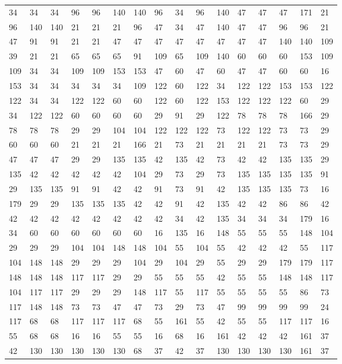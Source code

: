 \begin{longtable}{*{16}{l}}
34& 34& 34& 96& 96& 140& 140& 96& 34& 96& 140& 47& 47& 47& 171& 21\\
96& 140& 140& 21& 21& 21& 96& 47& 34& 47& 140& 47& 47& 96& 96& 21\\
47& 91& 91& 21& 21& 47& 47& 47& 47& 47& 47& 47& 47& 140& 140& 109\\
39& 21& 21& 65& 65& 65& 91& 109& 65& 109& 140& 60& 60& 60& 153& 109\\
109& 34& 34& 109& 109& 153& 153& 47& 60& 47& 60& 47& 47& 60& 60& 16\\
153& 34& 34& 34& 34& 34& 109& 122& 60& 122& 34& 122& 122& 153& 153& 122\\
122& 34& 34& 122& 122& 60& 60& 122& 60& 122& 153& 122& 122& 122& 60& 29\\
34& 122& 122& 60& 60& 60& 60& 29& 91& 29& 122& 78& 78& 78& 166& 29\\
78& 78& 78& 29& 29& 104& 104& 122& 122& 122& 73& 122& 122& 73& 73& 29\\
60& 60& 60& 21& 21& 21& 166& 21& 73& 21& 21& 21& 21& 73& 73& 29\\
47& 47& 47& 29& 29& 135& 135& 42& 135& 42& 73& 42& 42& 135& 135& 29\\
135& 42& 42& 42& 42& 42& 104& 29& 73& 29& 73& 135& 135& 135& 135& 91\\
29& 135& 135& 91& 91& 42& 42& 91& 73& 91& 42& 135& 135& 135& 73& 16\\
179& 29& 29& 135& 135& 135& 42& 42& 91& 42& 135& 42& 42& 86& 86& 42\\
42& 42& 42& 42& 42& 42& 42& 42& 34& 42& 135& 34& 34& 34& 179& 16\\
34& 60& 60& 60& 60& 60& 60& 16& 135& 16& 148& 55& 55& 55& 148& 104\\
29& 29& 29& 104& 104& 148& 148& 104& 55& 104& 55& 42& 42& 42& 55& 117\\
104& 148& 148& 29& 29& 29& 104& 29& 104& 29& 55& 29& 29& 179& 179& 117\\
148& 148& 148& 117& 117& 29& 29& 55& 55& 55& 42& 55& 55& 148& 148& 117\\
104& 117& 117& 29& 29& 29& 148& 117& 55& 117& 55& 55& 55& 55& 86& 73\\
117& 148& 148& 73& 73& 47& 47& 73& 29& 73& 47& 99& 99& 99& 99& 24\\
117& 68& 68& 117& 117& 117& 68& 55& 161& 55& 42& 55& 55& 117& 117& 16\\
55& 68& 68& 16& 16& 55& 55& 16& 68& 16& 161& 42& 42& 42& 161& 37\\
42& 130& 130& 130& 130& 130& 68& 37& 42& 37& 130& 130& 130& 130& 161& 37\\

\end{longtable}
